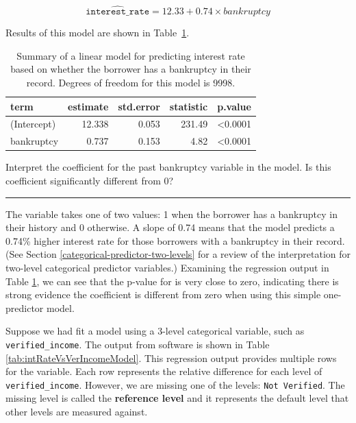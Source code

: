 \documentclass[
  10pt,
  openany]{book}
\theoremstyle{definition}
\theoremstyle{definition}
\theoremstyle{definition}
\theoremstyle{definition}
\theoremstyle{remark}
\begin{document}
\[\widehat{\texttt{interest_rate}} = 12.33 + 0.74 \times bankruptcy\]

Results of this model are shown in Table~\ref{tab:intRateVsPastBankrModel}.

\begin{table}
\centering
\caption{\label{tab:intRateVsPastBankrModel}Summary of a linear model for predicting interest rate based on whether the borrower has a bankruptcy in their record. Degrees of freedom for this model is 9998.}
\centering
\begin{tabular}[t]{l|r|r|r|l}
\hline
term & estimate & std.error & statistic & p.value\\
\hline
(Intercept) & 12.338 & 0.053 & 231.49 & <0.0001\\
\hline
bankruptcy & 0.737 & 0.153 & 4.82 & <0.0001\\
\hline
\end{tabular}
\end{table}

Interpret the coefficient for the past bankruptcy variable in the model. Is this coefficient significantly different from 0?

\begin{center}\rule{0.5\linewidth}{0.5pt}\end{center}

The variable takes one of two values: 1 when the borrower has a bankruptcy in their history and 0 otherwise. A slope of 0.74 means that the model predicts a 0.74\%
higher interest rate for those borrowers with a bankruptcy in their
record.
(See Section \ref{categorical-predictor-two-levels} for a review of the interpretation for two-level categorical predictor variables.)
Examining the regression output in Table \ref{tab:intRateVsPastBankrModel}, we can see that the p-value for is very close to zero, indicating there is strong evidence the coefficient is different from zero when using this simple one-predictor model.

Suppose we had fit a model using a 3-level categorical variable, such as \texttt{verified\_income}.
The output from software is shown in Table \ref{tab:intRateVsVerIncomeModel}.
This regression output provides multiple rows for the variable.
Each row represents the relative difference for each level of \texttt{verified\_income}.
However, we are missing one of the levels: \texttt{Not\ Verified}.
The missing level is called the \textbf{reference level} and it represents the default level that other levels are measured against.
\end{document}
